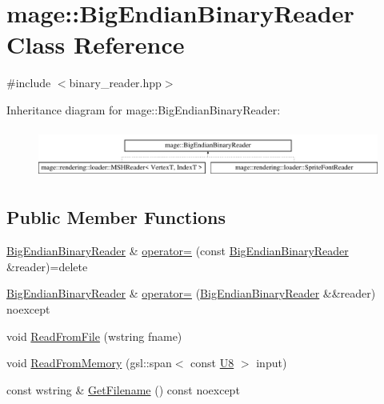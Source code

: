 \hypertarget{classmage_1_1_big_endian_binary_reader}{}\section{mage\+:\+:Big\+Endian\+Binary\+Reader Class Reference}
\label{classmage_1_1_big_endian_binary_reader}


{\ttfamily \#include $<$binary\+\_\+reader.\+hpp$>$}

Inheritance diagram for mage\+:\+:Big\+Endian\+Binary\+Reader\+:\begin{figure}[H]
\begin{center}
\leavevmode
\includegraphics[height=1.637427cm]{classmage_1_1_big_endian_binary_reader}
\end{center}
\end{figure}
\subsection*{Public Member Functions}
\begin{DoxyCompactItemize}
\item 
\hyperlink{classmage_1_1_big_endian_binary_reader}{Big\+Endian\+Binary\+Reader} \& \hyperlink{classmage_1_1_big_endian_binary_reader_abd4b24df4219469a8c2e9253b1cad405}{operator=} (const \hyperlink{classmage_1_1_big_endian_binary_reader}{Big\+Endian\+Binary\+Reader} \&reader)=delete
\item 
\hyperlink{classmage_1_1_big_endian_binary_reader}{Big\+Endian\+Binary\+Reader} \& \hyperlink{classmage_1_1_big_endian_binary_reader_ac37539cb08ea9278daf5628a0c5895d8}{operator=} (\hyperlink{classmage_1_1_big_endian_binary_reader}{Big\+Endian\+Binary\+Reader} \&\&reader) noexcept
\item 
void \hyperlink{classmage_1_1_big_endian_binary_reader_a68db676feaa42c1c3a9bf16d0680b04f}{Read\+From\+File} (wstring fname)
\item 
void \hyperlink{classmage_1_1_big_endian_binary_reader_afc48490dca5042078726a1ec3fe7abe7}{Read\+From\+Memory} (gsl\+::span$<$ const \hyperlink{namespacemage_afc638980bc6154f15af5e2d93a0e0ea9}{U8} $>$ input)
\item 
const wstring \& \hyperlink{classmage_1_1_big_endian_binary_reader_a801558f27606dbc681809178aaaaacd1}{Get\+Filename} () const noexcept
\end{DoxyCompactItemize}
